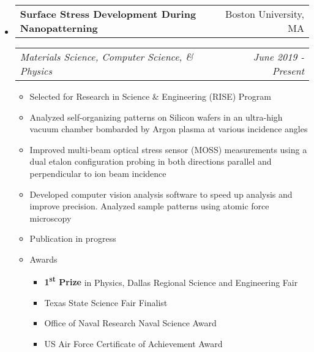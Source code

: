 \documentclass[letterpaper,11pt]{article}
\makeatletter
\newcommand{\resitem}[1]{\item #1 \vspace{-3pt}}
\newcommand{\ressubheading}[4]{
	\begin{tabular*}{7.0in}{l@{\extracolsep{\fill}}r}
			#1 & #2 \\
	\end{tabular*}
	\begin{tabular*}{7.0in}{l@{\extracolsep{\fill}}r}
			\textit{#3} & \textit{#4} \\
	\end{tabular*}\vspace{-6pt}}
\makeatother
\begin{document}
\begin{itemize}
\item
	\ressubheading{\textbf{Surface Stress Development During Nanopatterning}}{Boston University, MA}{Materials Science, Computer Science, \& Physics}{June 2019 - Present}
		\begin{itemize}
			\resitem{Selected for Research in Science \& Engineering (RISE) Program}
			\resitem{Analyzed self-organizing patterns on Silicon wafers in an ultra-high vacuum chamber bombarded by Argon plasma at various incidence angles}
			\resitem{Improved multi-beam optical stress sensor (MOSS) measurements using a dual etalon configuration probing in both directions parallel and perpendicular to ion beam incidence}
			\resitem{Developed computer vision analysis software to speed up analysis and improve precision. Analyzed sample patterns using atomic force microscopy}
			\resitem{Publication in progress}
			\resitem{Awards}
				\begin{itemize}
					\item[\textbullet] \textbf{1\textsuperscript{st} Prize} in Physics, Dallas Regional Science and Engineering Fair
					\item[\textbullet] Texas State Science Fair Finalist
					\item[\textbullet] Office of Naval Research Naval Science Award
					\item[\textbullet] US Air Force Certificate of Achievement Award
				\end{itemize}\vspace{-6pt}
		\end{itemize}\vspace{-6pt}
\end{itemize}

\vspace{6pt}
\end{document}
